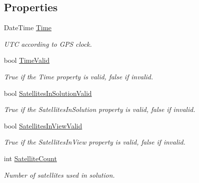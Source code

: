 \subsection*{Properties}
\begin{DoxyCompactItemize}
\item 
DateTime \hyperlink{class_g_p_s_mobile_1_1_gps_position_a53833ea1f1e4c4ad1c6946c26277a817}{Time}
\begin{DoxyCompactList}\small\item\em UTC according to GPS clock. \item\end{DoxyCompactList}\item 
bool \hyperlink{class_g_p_s_mobile_1_1_gps_position_a54c9d8150b16e5b0020f137532c63210}{TimeValid}
\begin{DoxyCompactList}\small\item\em True if the Time property is valid, false if invalid. \item\end{DoxyCompactList}\item 
bool \hyperlink{class_g_p_s_mobile_1_1_gps_position_aba3bb10f98a06a82ac9504e01f9aa4c5}{SatellitesInSolutionValid}
\begin{DoxyCompactList}\small\item\em True if the SatellitesInSolution property is valid, false if invalid. \item\end{DoxyCompactList}\item 
bool \hyperlink{class_g_p_s_mobile_1_1_gps_position_a6b4baeb146168192eb13fbbad8a1bdf7}{SatellitesInViewValid}
\begin{DoxyCompactList}\small\item\em True if the SatellitesInView property is valid, false if invalid. \item\end{DoxyCompactList}\item 
int \hyperlink{class_g_p_s_mobile_1_1_gps_position_a2b6d5feb969ab18a4a739250c62ffe25}{SatelliteCount}
\begin{DoxyCompactList}\small\item\em Number of satellites used in solution. \item\end{DoxyCompactList}\item 

\end{DoxyCompactItemize}
